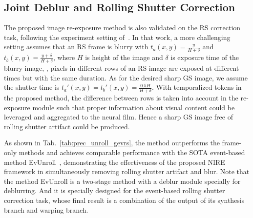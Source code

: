 \documentclass[10pt,twocolumn,letterpaper]{article}
\begin{document}
\subsection{Joint Deblur and Rolling Shutter Correction}

The proposed image re-exposure method is also validated on the RS correction task, following the experiment setting of~\cite{EvUnroll}.
In that work, a more challenging setting assumes that an RS frame is blurry with $t_a(x,y)=\frac{y}{H+\delta}$ and $t_b(x,y)=\frac{y+\delta}{H+\delta}$, where $H$ is height of the image and $\delta$ is exposure time of the blurry image, \ie, pixels in different rows of an RS image are exposed at different times but with the same duration.
As for the desired sharp GS image, we assume the shutter time is $t_a'(x,y)=t_b'(x,y)=\frac{0.5H}{H+\delta}$.
With temporalized tokens in the proposed method, the difference between rows is taken into account in the re-exposure module such that proper information about visual content could be leveraged and aggregated to the neural film. Hence a sharp GS image free of rolling shutter artifact could be produced.


\begin{table}[t!]
	\centering
\caption{Performance on joint deblur and RS correction.}
	\label{tab:prec_unroll_gevrs}
\end{table}

As shown in Tab.~\ref{tab:prec_unroll_gevrs},
the method outperforms the frame-only methods and achieves comparable performance with the SOTA event-based method EvUnroll~\cite{EvUnroll},
demonstrating the effectiveness of the proposed NIRE framework in simultaneously removing rolling shutter artifact and blur.
Note that the method EvUnroll is a two-stage method with a deblur module specially for deblurring. And it is specially designed for the
event-based rolling shutter correction task, whose final result is a combination of the output of its synthesis branch
and warping branch.
\end{document}
